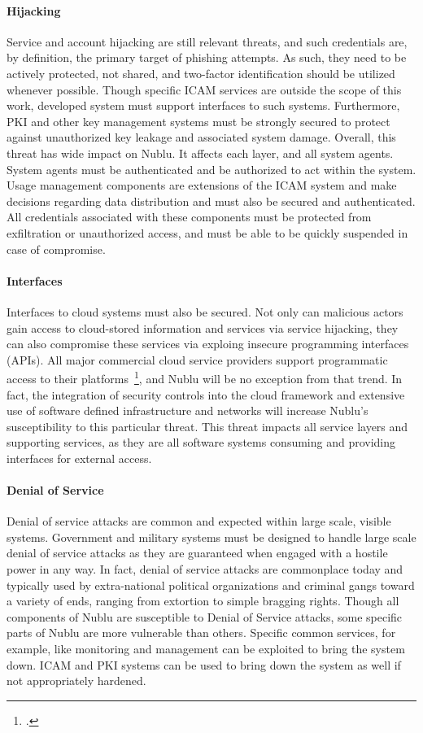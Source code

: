 \documentclass[10pt,letterpaper]{article}
\begin{document}
\paragraph{Hijacking} Service and account hijacking are still relevant threats, and such credentials are, by definition, the primary target of phishing attempts.  As such, they need to be actively protected, not shared, and two-factor identification should be utilized whenever possible.  Though specific ICAM services are outside the scope of this work, developed system must support interfaces to such systems.  Furthermore, PKI and other key management systems must be strongly secured to protect against unauthorized key leakage and associated system damage.  Overall, this threat has wide impact on Nublu.  It affects each layer, and all system agents.  System agents must be authenticated and be authorized to act within the system.  Usage management components are extensions of the ICAM system and make decisions regarding data distribution and must also be secured and authenticated.  All credentials associated with these components must be protected from exfiltration or unauthorized access, and must be able to be quickly suspended in case of compromise.

\paragraph{Interfaces} Interfaces to cloud systems must also be secured.  Not only can malicious actors gain access to cloud-stored information and services via service hijacking, they can also compromise these services via exploing insecure programming interfaces (APIs).  All major commercial cloud service providers support programmatic access to their platforms~\footcite{rackspace-api:13,amazon-api:13}, and Nublu will be no exception from that trend.  In fact, the integration of security controls into the cloud framework and extensive use of software defined infrastructure and networks will increase Nublu's susceptibility to this particular threat.  This threat impacts all service layers and supporting services, as they are all software systems consuming and providing interfaces for external access.

\paragraph{Denial of Service} Denial of service attacks are common and expected within large scale, visible systems.  Government and military systems must be designed to handle large scale denial of service attacks as they are guaranteed when engaged with a hostile power in any way.  In fact, denial of service attacks are commonplace today and typically used by extra-national political organizations and criminal gangs toward a variety of ends, ranging from extortion to simple bragging rights.  Though all components of Nublu are susceptible to Denial of Service attacks, some specific parts of Nublu are more vulnerable than others.  Specific common services, for example, like monitoring and management can be exploited to bring the system down.  ICAM and PKI systems can be used to bring down the system as well if not appropriately hardened.
\end{document}
